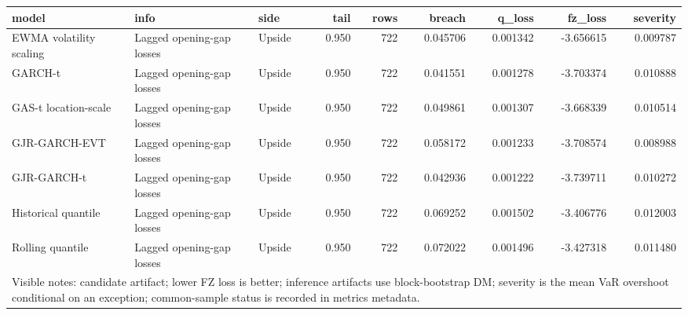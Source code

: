 \begin{tabular}{lllrrrrrr}
\toprule
model & info & side & tail & rows & breach & q_loss & fz_loss & severity \\
\midrule
EWMA volatility scaling & Lagged opening-gap losses & Upside & 0.950 & 722 & 0.045706 & 0.001342 & -3.656615 & 0.009787 \\
GARCH-t & Lagged opening-gap losses & Upside & 0.950 & 722 & 0.041551 & 0.001278 & -3.703374 & 0.010888 \\
GAS-t location-scale & Lagged opening-gap losses & Upside & 0.950 & 722 & 0.049861 & 0.001307 & -3.668339 & 0.010514 \\
GJR-GARCH-EVT & Lagged opening-gap losses & Upside & 0.950 & 722 & 0.058172 & 0.001233 & -3.708574 & 0.008988 \\
GJR-GARCH-t & Lagged opening-gap losses & Upside & 0.950 & 722 & 0.042936 & 0.001222 & -3.739711 & 0.010272 \\
Historical quantile & Lagged opening-gap losses & Upside & 0.950 & 722 & 0.069252 & 0.001502 & -3.406776 & 0.012003 \\
Rolling quantile & Lagged opening-gap losses & Upside & 0.950 & 722 & 0.072022 & 0.001496 & -3.427318 & 0.011480 \\
\midrule
\multicolumn{9}{l}{\footnotesize Visible notes: candidate artifact; lower FZ loss is better; inference artifacts use block-bootstrap DM; severity is the mean VaR overshoot conditional on an exception; common-sample status is recorded in metrics metadata.} \\
\bottomrule
\end{tabular}
